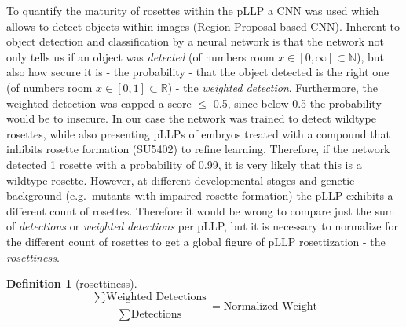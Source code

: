 \documentclass[10pt, b5paper, singlespacinge, twoside]{reedthesis} %
\theoremstyle{definition}
\newtheorem{definition}{Definition}[chapter]
\theoremstyle{definition}
\theoremstyle{definition}
\theoremstyle{remark}
\begin{document}
To quantify the maturity of rosettes within the pLLP a CNN was used which allows to detect objects within images (Region Proposal based CNN). Inherent to object detection and classification by a neural network is that the network not only tells us if an object was \emph{detected} (of numbers room \(x\in[0, \infty]\subset\mathbb{N}\)), but also how secure it is - the probability - that the object detected is the right one (of numbers room \(x\in[0, 1]\subset\mathbb{R}\)) - the \emph{weighted detection}. Furthermore, the weighted detection was capped a score \(\leq\) 0.5, since below 0.5 the probability would be to insecure. In our case the network was trained to detect wildtype rosettes, while also presenting pLLPs of embryos treated with a compound that inhibits rosette formation (SU5402) to refine learning. Therefore, if the network detected 1 rosette with a probability of 0.99, it is very likely that this is a wildtype rosette. However, at different developmental stages and genetic background (e.g.~mutants with impaired rosette formation) the pLLP exhibits a different count of rosettes. Therefore it would be wrong to compare just the sum of \emph{detections} or \emph{weighted detections} per pLLP, but it is necessary to normalize for the different count of rosettes to get a global figure of pLLP rosettization - the \emph{rosettiness}.
\begin{definition}[rosettiness]
\protect\hypertarget{def:unnamed-chunk-11}{}{\label{def:unnamed-chunk-11} {} }\[\frac{\sum_{} \textrm{Weighted Detections}}{\sum_{} \textrm{Detections}} = \textrm{Normalized Weight}\]
\end{definition}
\end{document}
